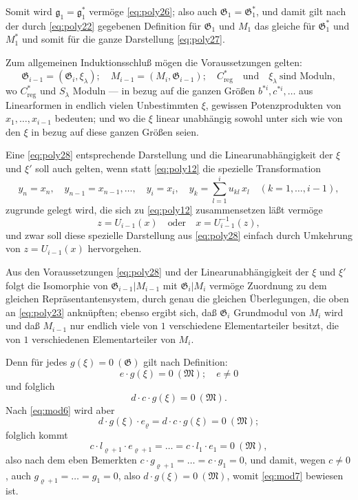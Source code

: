\documentclass[fontsize=10pt,paper=a5,pagesize,headings=small]{scrbook}
\newcommand{\ideal}[1]{\mathfrak{#1}}
\theoremstyle{plain}
\begin{document}
Somit wird $\ideal{g}_1 = \ideal{g}_1^*$ vermöge \eqref{eq:poly26}; also auch $\mathfrak{G}_1 = \mathfrak{G}_1^*$, und damit gilt nach der
durch \eqref{eq:poly22} gegebenen Definition für $\mathfrak{G}_1$ und $M_1$ das gleiche für $\mathfrak{G}_1^*$ und $M_1^*$
und somit für die ganze Darstellung \eqref{eq:poly27}.

\newpage
\setcounter{page}{437}

Zum allgemeinen Induktionsschluß mögen die Voraussetzungen gelten:
\begin{equation}
\label{eq:poly28}
\mathfrak{G}_{i-1} = (\mathfrak{G}_i, \xi_\lambda);\quad M_{i-1} = (M_i, \mathfrak{G}_{i-1});\quad C_{\text{reg}}^* \quad \text{und}\quad \xi_\lambda\ \text{sind Moduln},
\end{equation}
wo $C_{\text{reg}}^*$ und $S_\lambda$ Moduln --- in bezug auf die ganzen Größen $b^{*i}, c^{*i},\dots$ aus
Linearformen in endlich vielen Unbestimmten $\xi$, gewissen Potenzprodukten von
$x_1,\dots,x_{i-1}$ bedeuten; und wo die $\xi$ linear unabhängig sowohl unter sich wie von
den $\xi$ in bezug auf diese ganzen Größen seien.

Eine \eqref{eq:poly28} entsprechende Darstellung und die Linearunabhängigkeit der
$\xi$ und $\xi'$ soll auch gelten, wenn statt \eqref{eq:poly12} die spezielle Transformation
\begin{equation}
\label{eq:poly29}
y_n = x_n,\quad y_{n-1} = x_{n-1},\dots,\quad y_i = x_i,\quad y_k = \sum_{l=1}^{i} u_{kl}\,x_l
\quad (k=1,\dots,i-1),
\end{equation}
zugrunde gelegt wird, die sich zu \eqref{eq:poly12} zusammensetzen läßt vermöge
\[ z = U_{i-1}(x) \quad \text{oder}\quad x = U_{i-1}^{-1}(z), \]
und zwar soll diese spezielle Darstellung aus \eqref{eq:poly28} einfach durch Umkehrung
von $z = U_{i-1}(x)$ hervorgehen.

Aus den Voraussetzungen \eqref{eq:poly28} und der Linearunabhängigkeit der $\xi$ und
$\xi'$ folgt die Isomorphie von $\mathfrak{G}_{i-1}|M_{i-1}$ mit $\mathfrak{G}_i|M_i$ vermöge Zuordnung zu dem gleichen
Repräsentantensystem, durch genau die gleichen Überlegungen, die oben an
\eqref{eq:poly23} anknüpften; ebenso ergibt sich, daß $\mathfrak{G}_i$ Grundmodul von $M_i$ wird und
daß $M_{i-1}$ nur endlich viele von $1$ verschiedene Elementarteiler besitzt, die von $1$
verschiedenen Elementarteiler von $M_i$.

\newpage
\setcounter{page}{438}

Denn für jedes $g(\xi) = 0\ (\mathfrak{G})$ gilt nach Definition:
\[ e \cdot g(\xi) = 0\ (\mathfrak{M});\quad e \neq 0 \]
und folglich
\[ d \cdot c \cdot g(\xi) = 0\ (\mathfrak{M}). \]
Nach \eqref{eq:mod6} wird aber
\[ d \cdot g(\xi) \cdot e_\varrho = d \cdot c \cdot g(\xi) = 0\ (\mathfrak{M}); \]
folglich kommt
\[ c \cdot l_{\varrho+1} \cdot e_{\varrho+1} = \dots = c \cdot l_1 \cdot e_1 = 0\ (\mathfrak{M}), \]
also nach dem eben Bemerkten $c \cdot g_{\varrho+1} = \dots = c \cdot g_1 = 0$, und damit, wegen
$c \neq 0$, auch $g_{\varrho+1} = \dots = g_1 = 0$, also $d \cdot g(\xi) = 0\ (\mathfrak{M})$, womit \eqref{eq:mod7}
bewiesen ist.
\end{document}
